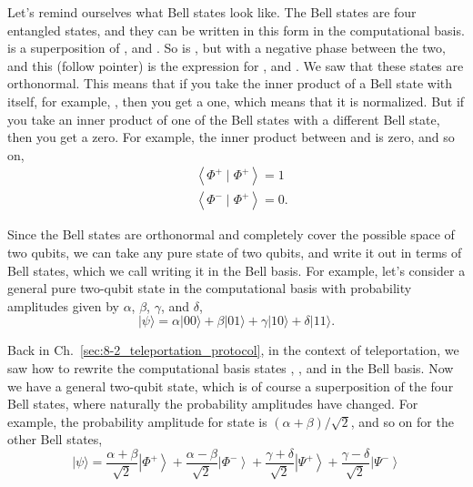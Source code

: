 Let's remind ourselves what Bell states look like.  The Bell states are four entangled states, and they can be written in this form in the computational basis. \ket{\Phi^+} is a superposition of  , and  . So is \ket{\Phi^-}, but with a negative phase between the two, and this (follow pointer) is the expression for \ket{\Psi^+}, and \ket{\Psi^-}. We saw that these states are orthonormal. This means that if you take the inner product of a Bell state with itself, for example, \ket{\Phi^+}, then you get a one, which means that it is normalized. But if you take an inner product of one of the Bell states with a different Bell state, then you get a zero. For example, the inner product between \ket{\Phi^-} and \ket{\Phi^+} is zero, and so on,
\begin{equation}
\begin{aligned}
&\left\langle\Phi^{+} \mid \Phi^{+}\right\rangle=1 \\
&\left\langle\Phi^{-} \mid \Phi^{+}\right\rangle=0.
\end{aligned}
\end{equation}

Since the Bell states are orthonormal and completely cover the possible space of two qubits, we can take any pure state of two qubits, and write it out in terms of Bell states, which we call writing it in the Bell basis. For example, let's consider a general pure two-qubit state in the computational basis with probability amplitudes given by $\alpha$, $\beta$, $\gamma$, and $\delta$,
\begin{equation}
|\psi\rangle=\alpha|00\rangle+\beta|01\rangle+\gamma|10\rangle+\delta|11\rangle.
\end{equation}

Back in Ch.~\ref{sec:8-2_teleportation_protocol}, in the context of teleportation, we saw how to rewrite the computational basis states , ,  and  in the Bell basis. Now we have a general two-qubit state, which is of course a superposition of the four Bell states, where naturally the probability amplitudes have changed. For example, the probability amplitude for state \ket{\Phi^+} is $(\alpha+\beta)/\sqrt{2}$, and so on for the other Bell states,
\begin{equation}
|\psi\rangle=\frac{\alpha+\beta}{\sqrt{2}}\left|\Phi^{+}\right\rangle+\frac{\alpha-\beta}{\sqrt{2}}\left|\Phi^{-}\right\rangle+\frac{\gamma+\delta}{\sqrt{2}}\left|\Psi^{+}\right\rangle+\frac{\gamma-\delta}{\sqrt{2}}\left|\Psi^{-}\right\rangle
\end{equation}

